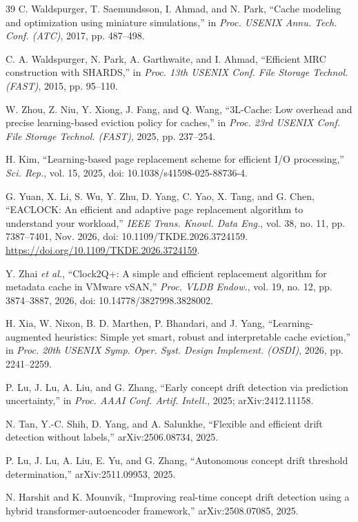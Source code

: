 \documentclass[10pt,twocolumn,a4paper]{IEEEtran}
\begin{document}
\begin{thebibliography}{39}
 C. Waldspurger, T. Saemundsson, I. Ahmad, and N. Park, ``Cache
modeling and optimization using miniature simulations,'' in \emph{Proc. USENIX
Annu. Tech. Conf. (ATC)}, 2017, pp. 487--498.

 C. A. Waldspurger, N. Park, A. Garthwaite, and I. Ahmad,
``Efficient MRC construction with SHARDS,'' in \emph{Proc. 13th USENIX Conf.
File Storage Technol. (FAST)}, 2015, pp. 95--110.

 W. Zhou, Z. Niu, Y. Xiong, J. Fang, and Q. Wang, ``3L-Cache:
Low overhead and precise learning-based eviction policy for caches,'' in
\emph{Proc. 23rd USENIX Conf. File Storage Technol. (FAST)}, 2025, pp.
237--254.

 H. Kim, ``Learning-based page replacement scheme for efficient
I/O processing,'' \emph{Sci. Rep.}, vol. 15, 2025, doi:
10.1038/s41598-025-88736-4.

 G. Yuan, X. Li, S. Wu, Y. Zhu, D. Yang, C. Yao, X. Tang, and G.
Chen, ``EACLOCK: An efficient and adaptive page replacement algorithm to
understand your workload,'' \emph{IEEE Trans. Knowl. Data Eng.}, vol. 38,
no. 11, pp. 7387--7401, Nov. 2026, doi: 10.1109/TKDE.2026.3724159.
\url{https://doi.org/10.1109/TKDE.2026.3724159}.

 Y. Zhai \emph{et al.}, ``Clock2Q+: A simple and efficient
replacement algorithm for metadata cache in VMware vSAN,'' \emph{Proc. VLDB
Endow.}, vol. 19, no. 12, pp. 3874--3887, 2026, doi: 10.14778/3827998.3828002.

 H. Xia, W. Nixon, B. D. Marthen, P. Bhandari, and J. Yang,
``Learning-augmented heuristics: Simple yet smart, robust and interpretable
cache eviction,'' in \emph{Proc. 20th USENIX Symp. Oper. Syst. Design Implement.
(OSDI)}, 2026, pp. 2241--2259.

 P. Lu, J. Lu, A. Liu, and G. Zhang, ``Early concept drift
detection via prediction uncertainty,'' in \emph{Proc. AAAI Conf. Artif.
Intell.}, 2025; arXiv:2412.11158.

 N. Tan, Y.-C. Shih, D. Yang, and A. Salunkhe, ``Flexible and
efficient drift detection without labels,'' arXiv:2506.08734, 2025.

 P. Lu, J. Lu, A. Liu, E. Yu, and G. Zhang, ``Autonomous concept
drift threshold determination,'' arXiv:2511.09953, 2025.

 N. Harshit and K. Mounvik, ``Improving real-time concept drift
detection using a hybrid transformer-autoencoder framework,''
arXiv:2508.07085, 2025.


\end{thebibliography}
\end{document}
